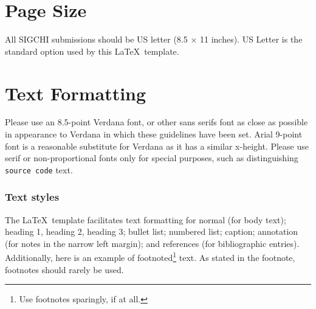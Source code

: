 \documentclass{sigchi-ext}
\begin{document}

\section{Page Size}
All SIGCHI submissions should be US letter (8.5 $\times$ 11
inches). US Letter is the standard option used by this \LaTeX\
template.

\section{Text Formatting}
Please use an 8.5-point Verdana font, or other sans serifs font as
close as possible in appearance to Verdana in which these guidelines
have been set. Arial 9-point font is a reasonable substitute for
Verdana as it has a similar x-height. Please use serif or
non-proportional fonts only for special purposes, such as
distinguishing \texttt{source code} text.

\subsubsection{Text styles}
The \LaTeX\ template facilitates text formatting for normal (for body
text); heading 1, heading 2, heading 3; bullet list; numbered list;
caption; annotation (for notes in the narrow left margin); and
references (for bibliographic entries). Additionally, here is an
example of footnoted\footnote{Use footnotes sparingly, if at all.}
text. As stated in the footnote, footnotes should rarely be used.
\end{document}
